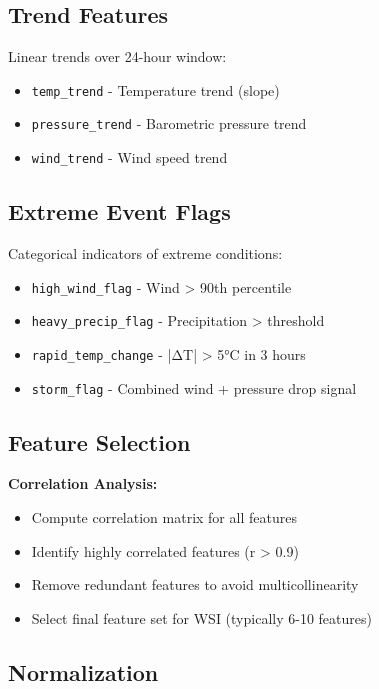 \documentclass[11pt,a4paper]{article}
\begin{document}
\subsection{Trend Features}

Linear trends over 24-hour window:
\begin{itemize}
    \item \texttt{temp\_trend} - Temperature trend (slope)
    \item \texttt{pressure\_trend} - Barometric pressure trend
    \item \texttt{wind\_trend} - Wind speed trend
\end{itemize}

\subsection{Extreme Event Flags}

Categorical indicators of extreme conditions:
\begin{itemize}
    \item \texttt{high\_wind\_flag} - Wind > 90th percentile
    \item \texttt{heavy\_precip\_flag} - Precipitation > threshold
    \item \texttt{rapid\_temp\_change} - |ΔT| > 5°C in 3 hours
    \item \texttt{storm\_flag} - Combined wind + pressure drop signal
\end{itemize}

\subsection{Feature Selection}

\textbf{Correlation Analysis:}
\begin{itemize}
    \item Compute correlation matrix for all features
    \item Identify highly correlated features (r > 0.9)
    \item Remove redundant features to avoid multicollinearity
    \item Select final feature set for WSI (typically 6-10 features)
\end{itemize}

\subsection{Normalization}
\end{document}
